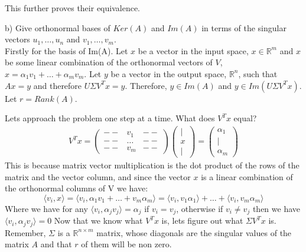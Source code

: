 \documentclass[12pt,twoside]{article}
\newcommand{\R}{\mathbb{R}}
\begin{document}
This further proves their equivalence. 






	\newpage
	
b) Give orthonormal bases of $Ker(A)$ and $Im(A)$ in terms of the singular vectors $u_1, \dots, u_n$ and $v_1, \dots , v_m$. \\

Firstly for the basis of Im(A). Let $x$ be a vector in the input space, $x\in \R^m$ and $x$ be some linear combination of the orthonormal vectors of $V$, $x=\alpha_1v_1 + \dots + \alpha_m v_m$. Let $y$ be a vector in the output space, $\R^n$, such that $Ax=y$ and therefore $U\Sigma V^Tx = y$. Therefore, $y\in Im(A)$ and $y\in Im(U\Sigma V^Tx)$. Let $r=Rank(A)$.

Lets approach the problem one step at a time. What does $V^Tx$ equal?
\begin{equation}
    \begin{split}
        V^Tx = \begin{pmatrix}
					-- & v_1 & -- \\
					-- & \dots & -- \\
					-- & v_m & --  
			\end{pmatrix}\begin{pmatrix}
			| \\
					x \\
					|
			\end{pmatrix} = \begin{pmatrix}
			\alpha_1 \\
			| \\
			\alpha_m
			\end{pmatrix}
    \end{split}
\end{equation}
This is because matrix vector multiplication is the dot product of the rows of the matrix and the vector column, and since the vector $x$ is a linear combination of the orthonormal columns of V we have:
$$
    \langle v_i, x \rangle = \langle v_i, \alpha_1 v_1 + \dots + v_m\alpha_m \rangle = \langle v_i, v_1\alpha_1 \rangle + \dots + \langle v_i, v_m\alpha_m \rangle $$
Where we have for any $\langle v_i, \alpha_jv_j \rangle = \alpha_j$ if $v_i=v_j$, otherwise if $v_i \neq v_j$ then we have $\langle v_i, \alpha_jv_j \rangle =0$
Now that we know what $V^Tx$ is, lets figure out what $\Sigma V^Tx$ is. Remember, $\Sigma$ is a $\R^{n\times m}$ matrix, whose diagonals are the singular values of the matrix $A$ and that $r$ of them will be non zero.
\end{document}
